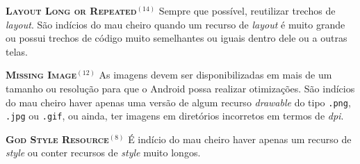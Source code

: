 
  \noindent
  \textbf{\textsc{{\small Layout Long or Repeated}}}$^{(14)}$
      Sempre que possível, reutilizar trechos de \textit{layout}. São indícios do mau cheiro quando um recurso de \textit{layout} é muito grande ou possui trechos de código muito semelhantes ou iguais dentro dele ou a outras telas.


  \noindent
  \textbf{\textsc{{\small Missing Image}}}$^{(12)}$
      As imagens devem ser disponibilizadas em mais de um tamanho ou resolução para que o Android possa realizar otimizações. São indícios do mau cheiro haver apenas uma versão de algum recurso \textit{drawable} do tipo \texttt{.png}, \texttt{.jpg} ou \texttt{.gif}, ou ainda, ter imagens em diretórios incorretos em termos de \textit{dpi}.


  \noindent
  \textbf{\textsc{{\small God Style Resource}}}$^{(8)}$
      É indício do mau cheiro haver apenas um recurso de \textit{style} ou conter recursos de \textit{style} muito longos.

